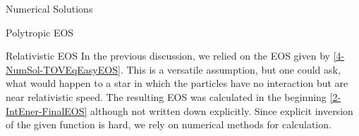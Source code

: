 \begin{section}{Numerical Solutions}
\begin{subsection}{Polytropic EOS}
\end{subsection}
%
%
\begin{subsection}{Relativistic EOS}
In the previous discussion, we relied on the EOS given by \ref{4-NumSol-TOVEqEasyEOS}. This is a versatile assumption, but one could ask, what would happen to a star in which the particles have no interaction but are near relativistic speed. The resulting EOS was calculated in the beginning \ref{2-IntEner-FinalEOS} although not written down explicitly. Since explicit inversion of the given function is hard, we rely on numerical methods for calculation.

\end{subsection}
%
%
\end{section}

